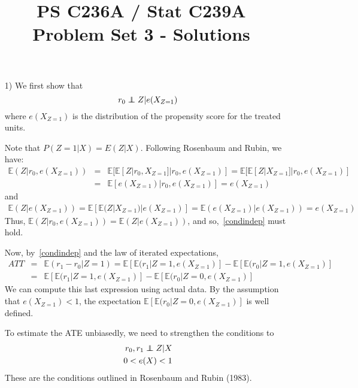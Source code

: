 \documentclass{article}
\newcommand\independent{\protect\mathpalette{\protect\independenT}{\perp}}
\def\independenT#1#2{\mathrel{\rlap{$#1#2$}\mkern2mu{#1#2}}}
\def\E{{\mathbb E}}
\begin{document}
\title{PS C236A / Stat C239A \\ Problem Set 3 - Solutions}
\date{}
\maketitle
\begin{itemize}
  \item[1)]
   We first show that 
   \begin{equation}
     r_0 \independent Z | e(X_{Z=1})
     \label{condindep}
   \end{equation}
   where $e(X_{Z=1})$ is the distribution of the propensity score for the treated units.
   
   Note that 
   $P(Z=1|X) = E(Z|X)$.
   Following Rosenbaum and Rubin, we have:
   \begin{eqnarray*}
     \E(Z  | r_0, e(X_{Z=1})) & = & \E[\E[Z | r_0, X_{Z=1}] | r_0, e(X_{Z=1}) ]
     = \E[\E[Z | X_{Z=1}] | r_0, e(X_{Z=1}) ]\\
     &=& \E[e(X_{Z=1})|r_0, e(X_{Z=1})] = e(X_{Z=1})
   \end{eqnarray*}
   and
   \begin{eqnarray*}
     \E(Z | e(X_{Z=1})) = \E[\E(Z | X_{Z=1})| e(X_{Z=1})] = \E(e(X_{Z=1})| e(X_{Z=1})) = e(X_{Z=1})
   \end{eqnarray*}
   Thus, $\E(Z  | r_0, e(X_{Z=1})) = \E(Z  |  e(X_{Z=1}))$, and so,~\eqref{condindep} must hold.
   
   Now, by~\eqref{condindep} and the law of iterated expectations,
   \begin{eqnarray*}
     ATT &=& \E(r_1 - r_0 | Z= 1) = \E[\E(r_1|Z = 1, e(X_{Z=1})] - \E[\E(r_0|Z = 1, e(X_{Z=1})] \\
       &=& \E[\E(r_1|Z = 1, e(X_{Z=1})] - \E[\E(r_0|Z = 0, e(X_{Z=1})] 
   \end{eqnarray*}
   We can compute this last expression using actual data.
   By the assumption that $e(X_{Z=1}) < 1$, the
   expectation $\E[\E(r_0|Z = 0, e(X_{Z=1})]$ is well defined.
   
   To estimate the ATE unbiasedly, we need to strengthen the conditions to
   \begin{eqnarray*}
     r_0, r_1 \independent Z | X \\
     0 < e(X) < 1
   \end{eqnarray*}
   These are the conditions outlined in Rosenbaum and Rubin (1983).


\end{itemize}
\end{document}
